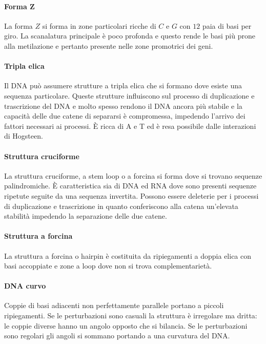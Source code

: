 			\paragraph{Forma $\mathbf{Z}$}
			La forma $Z$ si forma in zone particolari ricche di $C$ e $G$ con $12$ paia di basi per giro.
			La scanalatura principale \`e poco profonda e questo rende le basi pi\`u prone alla metilazione e pertanto presente nelle zone promotrici dei geni.

			\paragraph{Tripla elica}
			Il DNA pu\`o assumere strutture a tripla elica che si formano dove esiste una sequenza particolare. 
			Queste strutture influiscono sul processo di duplicazione e trascrizione del DNA e molto spesso rendono il DNA ancora pi\`u stabile e la capacit\`a delle due catene di separarsi \`e compromessa, impedendo l'arrivo dei fattori necessari ai processi. 
			\`E ricca di A e T ed \`e resa possibile dalle interazioni di Hogsteen. 

			\paragraph{Struttura cruciforme}
			La struttura cruciforme, a stem loop o a forcina si forma dove si trovano sequenze palindromiche. 
			\`E caratteristica sia di DNA ed RNA dove sono presenti sequenze ripetute seguite da una sequenza invertita. 
			Possono essere deleterie per i processi di duplicazione e trascrizione in quanto conferiscono alla catena un'elevata stabilit\`a impedendo la separazione delle due catene. 

			\paragraph{Struttura a forcina}
			La struttura a forcina o hairpin \`e costituita da ripiegamenti a doppia elica con basi accoppiate e zone a loop dove non si trova complementariet\`a.

			\paragraph{DNA curvo}
			Coppie di basi adiacenti non perfettamente parallele portano a piccoli ripiegamenti.
			Se le perturbazioni sono casuali la struttura \`e irregolare ma dritta: le coppie diverse hanno un angolo opposto che si bilancia.
			Se le perturbazioni sono regolari gli angoli si sommano portando a una curvatura del DNA.

